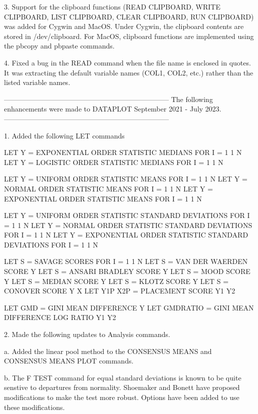  3. Support for the clipboard functions (READ CLIPBOARD, WRITE CLIPBOARD,
    LIST CLIPBOARD, CLEAR CLIPBOARD, RUN CLIPBOARD) was added for
    Cygwin and MacOS.  Under Cygwin, the clipboard contents are stored
    in /dev/clipboard.   For MacOS, clipboard functions are implemented
    using the pbcopy and pbpaste commands.

 4. Fixed a bug in the READ command when the file name is enclosed in
    quotes.  It was extracting the default variable names (COL1, COL2,
    etc.) rather than the listed variable names.

-----------------------------------------------------------------------
The following enhancements were made to DATAPLOT
September 2021 - July 2023.
-----------------------------------------------------------------------

 1. Added the following LET commands

        LET Y = EXPONENTIAL ORDER STATISTIC MEDIANS FOR I = 1 1 N
        LET Y = LOGISTIC    ORDER STATISTIC MEDIANS FOR I = 1 1 N

        LET Y = UNIFORM     ORDER STATISTIC MEANS   FOR I = 1 1 N
        LET Y = NORMAL      ORDER STATISTIC MEANS   FOR I = 1 1 N
        LET Y = EXPONENTIAL ORDER STATISTIC MEANS   FOR I = 1 1 N

        LET Y = UNIFORM     ORDER STATISTIC STANDARD DEVIATIONS FOR I = 1 1 N
        LET Y = NORMAL      ORDER STATISTIC STANDARD DEVIATIONS FOR I = 1 1 N
        LET Y = EXPONENTIAL ORDER STATISTIC STANDARD DEVIATIONS FOR I = 1 1 N

        LET S = SAVAGE SCORES FOR I = 1 1 N
        LET S = VAN DER WAERDEN SCORE Y
        LET S = ANSARI BRADLEY SCORE Y
        LET S = MOOD SCORE Y
        LET S = MEDIAN SCORE Y
        LET S = KLOTZ SCORE Y
        LET S = CONOVER SCORE Y X
        LET Y1P X2P = PLACEMENT SCORE Y1 Y2

        LET GMD      = GINI MEAN DIFFERENCE Y
        LET GMDRATIO = GINI MEAN DIFFERENCE LOG RATIO Y1 Y2

 2. Made the following updates to Analysis commands.

    a. Added the linear pool method to the CONSENSUS MEANS and CONSENSUS
       MEANS PLOT commands.

    b. The F TEST command for equal standard deviations is known to be
       quite senstive to departures from normality.  Shoemaker and Bonett
       have proposed modifications to make the test more robust.  Options
       have been added to use these modifications.

